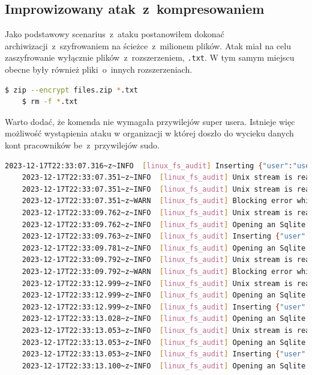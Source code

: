 \subsection{Improwizowany atak~z~kompresowaniem}
Jako podstawowy scenarius~z~ataku postanowiłem dokonać archiwizacji~z~szyfrowaniem na ścieżce~z~milionem plików. Atak miał na celu zaszyfrowanie wyłącznie plików~z~rozszerzeniem, \texttt{.txt}. W tym samym miejscu obecne były również pliki~o~innych rozszerzeniach.
\begin{lstlisting}[language=bash,
    backgroundcolor=\color{EEGold!5!white},
    caption={Komenda użyta do wykonania "ataku".},
    label={lst:commau}]
    $ zip --encrypt files.zip *.txt
    $ rm -f *.txt
\end{lstlisting}
Warto dodać, że komenda nie wymagała przywilejów super usera. Istnieje więc możliwość wystąpienia ataku w organizacji w której doszło do wycieku danych kont pracowników be~z~przywilejów sudo.
\begin{lstlisting}[language=bash,
    backgroundcolor=\color{EEGold!5!white},
    caption={Fragment logów~z~części audytowej. Będzie to jedyny tak długi fragment, który
    chciałem pokazać w celach informacyjnych.},
    label={lst:logau}]
    2023-12-17T22:33:07.316~z~INFO  [linux_fs_audit] Inserting {"user":"userA","group":"userA","executable":"/usr/bin/rm","syscall":"unlinkat","timestamp":"1702852387","key":"WRITE"}
    2023-12-17T22:33:07.351~z~INFO  [linux_fs_audit] Unix stream is readable.
    2023-12-17T22:33:07.351~z~INFO  [linux_fs_audit] Unix stream is readable.
    2023-12-17T22:33:07.351~z~WARN  [linux_fs_audit] Blocking error while reading from socket
    2023-12-17T22:33:09.762~z~INFO  [linux_fs_audit] Unix stream is readable.
    2023-12-17T22:33:09.762~z~INFO  [linux_fs_audit] Opening an Sqlite connection
    2023-12-17T22:33:09.763~z~INFO  [linux_fs_audit] Inserting {"user":"userA","group":"userA","executable":"/usr/bin/bash","syscall":"openat","timestamp":"1702852389","key":"READ"}
    2023-12-17T22:33:09.781~z~INFO  [linux_fs_audit] Opening an Sqlite connection
    2023-12-17T22:33:09.792~z~INFO  [linux_fs_audit] Unix stream is readable.
    2023-12-17T22:33:09.792~z~WARN  [linux_fs_audit] Blocking error while reading from socket
    2023-12-17T22:33:12.999~z~INFO  [linux_fs_audit] Unix stream is readable
    2023-12-17T22:33:12.999~z~INFO  [linux_fs_audit] Opening an Sqlite connection
    2023-12-17T22:33:12.999~z~INFO  [linux_fs_audit] Inserting {"user":"userA","group":"userA","executable":"/usr/bin/zip","syscall":"openat","timestamp":"1702852392","key":"WRITE"}
    2023-12-17T22:33:13.028~z~INFO  [linux_fs_audit] Opening an Sqlite connection
    2023-12-17T22:33:13.053~z~INFO  [linux_fs_audit] Unix stream is readable.
    2023-12-17T22:33:13.053~z~INFO  [linux_fs_audit] Opening an Sqlite connection
    2023-12-17T22:33:13.053~z~INFO  [linux_fs_audit] Inserting {"user":"userA","group":"userA","executable":"/usr/bin/zip","syscall":"unlink","timestamp":"1702852393","key":"WRITE"}
    2023-12-17T22:33:13.100~z~INFO  [linux_fs_audit] Opening an Sqlite connection
\end{lstlisting}
